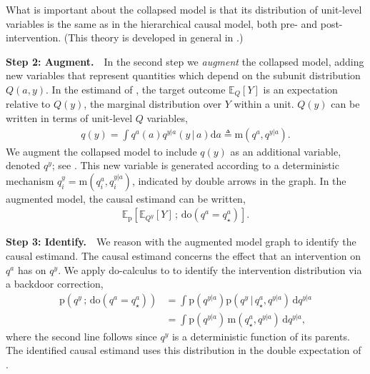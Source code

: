\documentclass[12pt]{article}
\newcommand{\EE}[2]{\mathbb{E}_{#1}\left[ #2 \right]}
\newcommand{\rmdo}{\mathrm{do}}
\newcommand{\s}{\, ; \,}
\newcommand{\g}{\,\vert\,}
\newcommand{\di}{\mathrm{d}}
\newcommand{\pr}{\mathrm{p}}
\newcommand{\m}{\mathrm{m}}
\newcommand{\parheadsmall}[1]{\vspace{0.1in} \noindent \textbf{#1} \,\,}
\begin{document}
What is important about the collapsed model is that its distribution
of unit-level variables is the same as in the hierarchical causal
model, both pre- and post-intervention. (This theory is developed in
general in .)

\parheadsmall{Step 2: Augment.} In the second step we \textit{augment} the
collapsed model, adding new variables that represent quantities which
depend on the subunit distribution $Q(a,y)$. In the estimand of
, the target outcome
$\EE{Q}{Y}$ is an expectation relative to $Q(y)$, the
marginal distribution over $Y$ within a unit. $Q(y)$ can be written in terms of unit-level $Q$ variables,
\begin{align} \label{eqn:deterministic_qy_mech}
  q(y) = \int q^a(a) q^{y|a}(y \g a) \di a  \triangleq \m(q^a, q^{y|a}).
\end{align}
We augment the collapsed model to include $q(y)$ as an additional variable, denoted $q^y$;
see . This new variable is generated according to a
deterministic mechanism $q^y_i = \m(q^a_i, q^{y|a}_i)$, indicated by
double arrows in the graph. In the augmented model, the causal estimand can be written,
\begin{align}
  \label{eq:augmented_estimand}
  \EE{\pr}{\EE{Q^y}{Y} \s \rmdo(q^a=q^a_\star)}.
\end{align}















\parheadsmall{Step 3: Identify.} We reason with the augmented model graph
to identify the causal estimand. The causal estimand concerns the
effect that an intervention on $q^a$ has on $q^y$. We apply do-calculus to
 to identify the intervention distribution via a backdoor correction,
\begin{equation} \label{eq:collapse_id}
\begin{split}
  \pr(q^y \s \rmdo(q^a = q^a_\star))
  &=
    \int \pr(q^{y|a}) \pr(q^y \g q^a_\star, q^{y|a}) \, \di q^{y|a} \\
  &=
    \int \pr(q^{y|a}) \, \m(q^a_\star, q^{y|a}) \, \di q^{y|a},
\end{split}
\end{equation}
where the second line follows since $q^y$ is a deterministic
function of its parents. The identified causal estimand uses this distribution in the
double expectation of .
\end{document}

